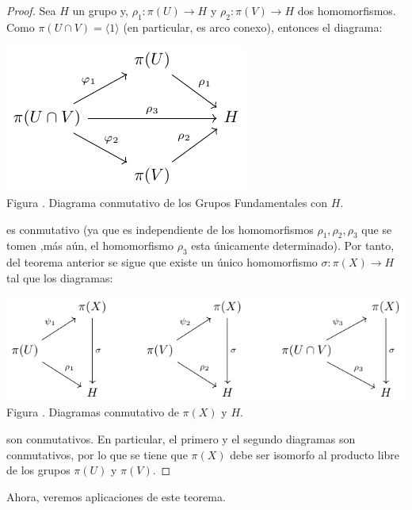 \documentclass[12pt]{report}
\theoremstyle{largebreak}
\newcommand\cf[3]{\ensuremath{#1:#2\rightarrow#3}}
\newcounter{figcount}
\begin{document}
    \begin{proof}
        Sea $H$ un grupo y, $\cf{\rho_1}{\pi(U)}{H}$ y $\cf{\rho_2}{\pi(V)}{H}$ dos homomorfismos. Como $\pi(U\cap V)=\langle 1\rangle$ (en particular, es arco conexo), entonces el diagrama:

        \begin{minipage}{\textwidth}
            \begin{center}
                \includegraphics[scale=1.5]{images/fig_1.pdf}\\
                Figura \thefigcount. Diagrama conmutativo de los Grupos Fundamentales con $H$.
            \end{center}
        \end{minipage}

        es conmutativo (ya que es independiente de los homomorfismos $\rho_1,\rho_2,\rho_3$ que se tomen ,más aún, el homomorfismo $\rho_3$ esta únicamente determinado). Por tanto, del teorema anterior se sigue que existe un único homomorfismo $\cf{\sigma}{\pi(X)}{H}$ tal que los diagramas:

        \begin{minipage}{\textwidth}
            \begin{center}
                \includegraphics[scale=1.5]{images/fig_2.pdf}\\
                Figura \thefigcount. Diagramas conmutativo de $\pi(X)$ y $H$.
            \end{center}
        \end{minipage}

        son conmutativos. En particular, el primero y el segundo diagramas son conmutativos, por lo que se tiene que $\pi(X)$ debe ser isomorfo al producto libre de los grupos $\pi(U)$ y $\pi(V)$.
    \end{proof}

    Ahora, veremos aplicaciones de este teorema.

    \begin{exa}
        
    \end{exa}
\end{document}
